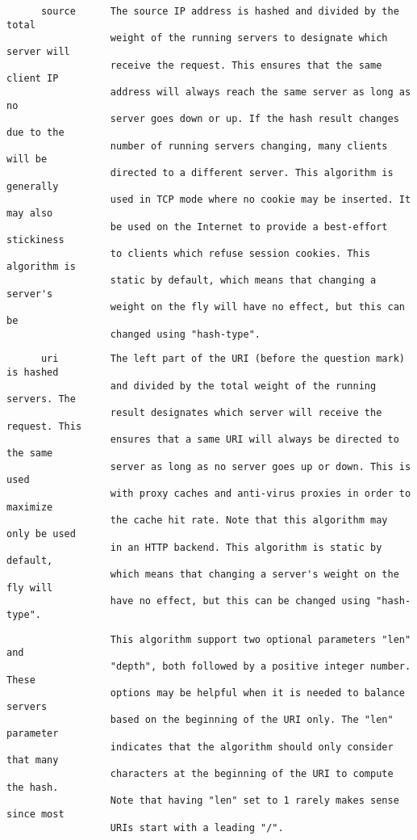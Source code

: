 \begin{verbatim}
      source      The source IP address is hashed and divided by the total
                  weight of the running servers to designate which server will
                  receive the request. This ensures that the same client IP
                  address will always reach the same server as long as no
                  server goes down or up. If the hash result changes due to the
                  number of running servers changing, many clients will be
                  directed to a different server. This algorithm is generally
                  used in TCP mode where no cookie may be inserted. It may also
                  be used on the Internet to provide a best-effort stickiness
                  to clients which refuse session cookies. This algorithm is
                  static by default, which means that changing a server's
                  weight on the fly will have no effect, but this can be
                  changed using "hash-type".
\end{verbatim}

\begin{verbatim}
      uri         The left part of the URI (before the question mark) is hashed
                  and divided by the total weight of the running servers. The
                  result designates which server will receive the request. This
                  ensures that a same URI will always be directed to the same
                  server as long as no server goes up or down. This is used
                  with proxy caches and anti-virus proxies in order to maximize
                  the cache hit rate. Note that this algorithm may only be used
                  in an HTTP backend. This algorithm is static by default,
                  which means that changing a server's weight on the fly will
                  have no effect, but this can be changed using "hash-type".
\end{verbatim}

\begin{verbatim}
                  This algorithm support two optional parameters "len" and
                  "depth", both followed by a positive integer number. These
                  options may be helpful when it is needed to balance servers
                  based on the beginning of the URI only. The "len" parameter
                  indicates that the algorithm should only consider that many
                  characters at the beginning of the URI to compute the hash.
                  Note that having "len" set to 1 rarely makes sense since most
                  URIs start with a leading "/".
\end{verbatim}

